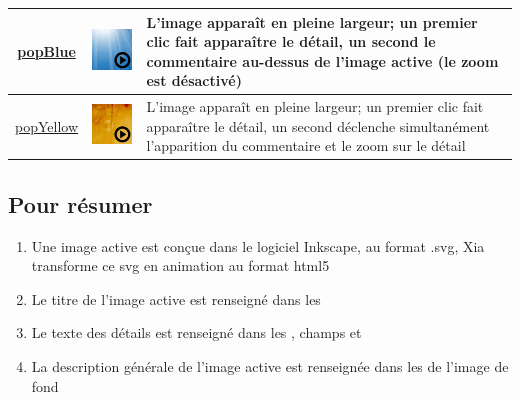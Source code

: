 {\begin{center}
\begin{tabular}{|c|c|p{3in}|}
\hline
\href{http://geoffrey-gekiere.ac-versailles.fr/xia1/popBlue}{popBlue} &  \includegraphics[scale=0.5]{./images/popBlue} & L'image apparaît en pleine largeur; un premier clic fait apparaître le détail, un second le commentaire au-dessus de l'image active (le zoom est désactivé)\\
\hline
\href{http://geoffrey-gekiere.ac-versailles.fr/xia1/popYellow}{popYellow} &  \includegraphics[scale=0.5]{./images/popYellow} & L'image apparaît en pleine largeur; un premier clic fait apparaître le détail, un second déclenche simultanément l'apparition du commentaire et le zoom sur le détail\\
\hline
\end{tabular}
\end{center}

\subsection{Pour résumer}

\begin{enumerate}
 \item Une image active est conçue dans le logiciel Inkscape, au format .svg, 
 Xia transforme ce svg en animation au format html5
 \item Le titre de l'image active est renseigné dans les 
 \item Le texte des détails est renseigné dans les ,
 champs  et 
 \item La description générale de l'image active est renseignée dans les  
 de l'image de fond
\end{enumerate}

}
